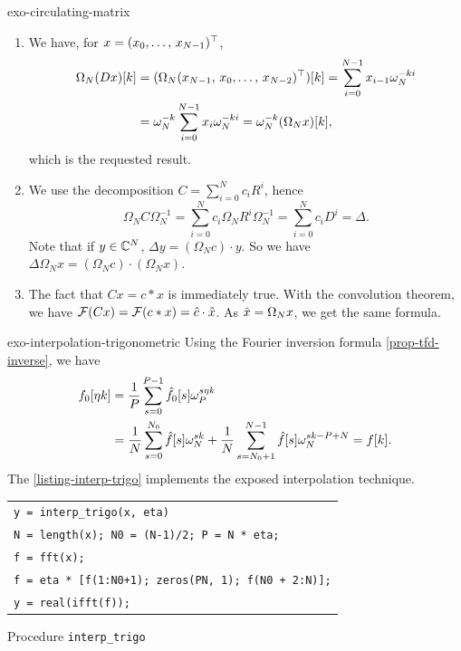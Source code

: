 
\begin{correction}{exo-circulating-matrix}
\begin{enumerate}
\item We have, for $ x = (x_0, \ldots, \, x_{N-1})^\top $,
\begin{align*}
\Omega_N (D x) [k] & = (\Omega_N (x_{N-1}, \, x_0, \ldots, \, x_{N-2})^\top) [k] = \sum_{i = 0}^{N-1}{x_{i-1} \omega_N^{- ki}} \\
& = \omega_N^{- k} \sum_{i = 0}^{N-1}{x_{i} \omega_N^{- ki}} = \omega_N^{- k} (\Omega_N x) [k ],
\end{align*}
which is the requested result.
\item We use the decomposition $ C = \sum_{i = 0}^N{c_i R^{i}} $, hence
\begin{equation*}
\Omega_N C \Omega_N^{-1} = \sum_{i = 0}^N{c_i \Omega_N R^{i} \Omega_N^{-1}} = \sum_{i = 0}^N{c_i D^i} = \Delta.
\end{equation*}
Note that if $ y \in \mathbb{C}^N $, $ \Delta y = (\Omega_N c) \cdot y $. So we have $ \Delta \Omega_N x = (\Omega_N c) \cdot (\Omega_N x) $.
\item The fact that $ C x = c * x $ is immediately true. With the convolution theorem, we have $ \mathcal{F}(C x) = \mathcal{F}(c * x) = \hat{c} \cdot \hat{x} $. As $ \hat{x} = \Omega_N x $, we get the same formula.
\end{enumerate}
\end{correction}
 
 
\begin{correction}{exo-interpolation-trigonometric}
Using the Fourier inversion formula \ref{prop-tfd-inverse}, we have
\begin{align*}
f_0 [\eta k] & = \frac{1}{P} \sum_{s = 0}^{P-1}{\hat{f_0}[s] \omega_P^{s \eta k}} \\
& = \frac{1}{N} \sum_{s = 0}^{N_0}{\hat{f}[s] \omega_N^{sk}} + \frac{1}{N} \sum_{s = N_0+1}^{N-1}{\hat{f}[s] \omega_N^{sk - P + N}} = f [k].
\end{align*}
The \listingterme{} \ref{listing-interp-trigo} implements the exposed interpolation technique.

\begin{listing} \begin{footnotesize}
{\upshape
\begin{tabular}{l} \texttt{\pfunction y = interp\_trigo(x, eta)} \\
\texttt{N = length(x); N0 = (N-1)/2; P = N * eta;} \\
\texttt{f = fft(x);} \\
\texttt{f = eta * [f(1:N0+1); zeros(PN, 1); f(N0 + 2:N)];} \\
\texttt{y = real(ifft(f));} \\
\end{tabular}
}
\end{footnotesize}
\caption{Procedure \texttt{\upshape interp\_trigo}}
\label{listing-interp-trigo}
\end{listing}
\end{correction}
 
